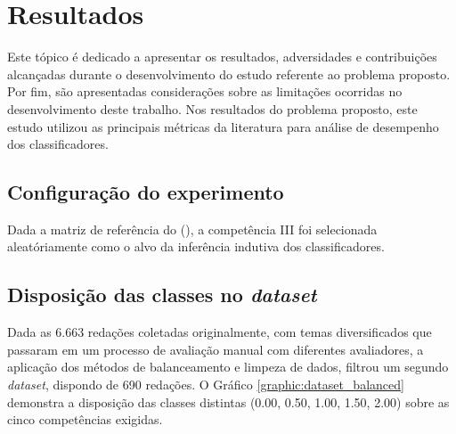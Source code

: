 \section{Resultados}

Este tópico é dedicado a apresentar os resultados, adversidades e contribuições 
alcançadas durante o desenvolvimento do estudo referente ao problema proposto. 
Por fim, são apresentadas considerações sobre as limitações ocorridas no 
desenvolvimento deste trabalho. Nos resultados do problema proposto, este 
estudo utilizou as principais métricas da literatura para análise de desempenho 
dos classificadores.

\subsection{Configuração do experimento}

Dada a matriz de referência do \citeauthor{edital_enem:2016} 
(\citeyear{edital_enem:2016}), a competência III foi selecionada 
aleatóriamente como o alvo da inferência indutiva dos classificadores.

\subsection{Disposição das classes no \textit{dataset}}

Dada as 6.663 redações coletadas originalmente, com temas diversificados que 
passaram em um processo de avaliação manual com diferentes avaliadores, a 
aplicação dos métodos de balanceamento e limpeza de dados, filtrou um segundo 
\textit{dataset}, dispondo de 690 redações. O Gráfico 
\ref{graphic:dataset_balanced} demonstra a disposição das classes distintas 
(0.00, 0.50, 1.00, 1.50, 2.00) sobre as cinco competências exigidas.

